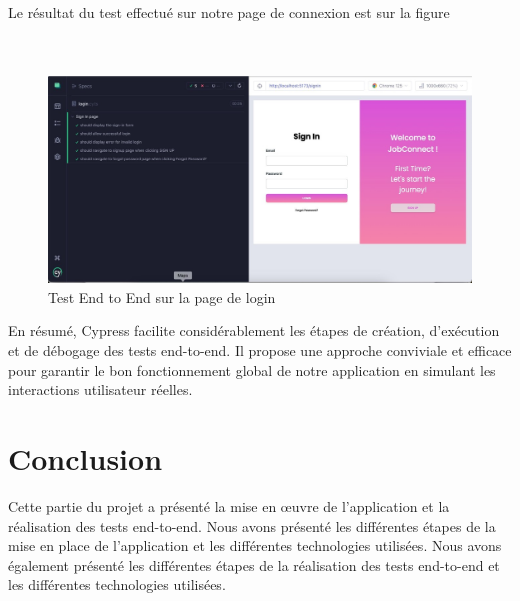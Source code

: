 Le résultat du test effectué sur notre page de connexion est sur la figure
\\
\\
\\
\begin{figure}[htbp]
   \centering
   \includegraphics[scale=0.4]{cypress/5.jpg} 
   \caption{ Test End to End sur la page de login}
   \label{fig:listOffers}
\end{figure}

En résumé, Cypress facilite considérablement les étapes de création, d’exécution et de débogage des tests end-to-end. Il propose une approche conviviale et eﬀicace pour garantir le bon fonctionnement global de notre application en simulant les interactions utilisateur réelles.


\section{Conclusion}
Cette partie du projet a présenté la mise en œuvre de l'application et  la  réalisation  des tests end-to-end. 
Nous avons présenté les différentes étapes de la mise en place de l'application et les différentes
technologies utilisées. Nous avons également présenté les différentes étapes de la réalisation des tests
end-to-end et les différentes technologies utilisées. 
\newline
